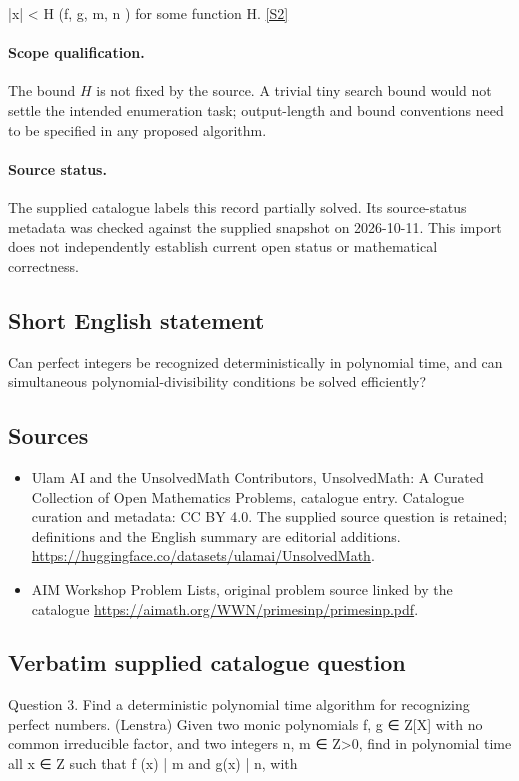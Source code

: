 \documentclass[11pt]{article}
\begin{document}
|x| < H (f, g, m, n ) for some function H. \href{https://aimath.org/WWN/primesinp/primesinp.pdf}{[S2]}
\paragraph{Scope qualification.}
The bound $H$ is not fixed by the source. A trivial tiny search bound would not settle the intended enumeration task; output-length and bound conventions need to be specified in any proposed algorithm.
\paragraph{Source status.}
The supplied catalogue labels this record partially solved. Its source-status metadata was checked against the supplied snapshot on 2026-10-11. This import does not independently establish current open status or mathematical correctness.
\subsection{Short English statement}
Can perfect integers be recognized deterministically in polynomial time, and can simultaneous polynomial-divisibility conditions be solved efficiently?
\subsection{Sources}
\begin{itemize}
\item[S1] Ulam AI and the UnsolvedMath Contributors, UnsolvedMath: A Curated Collection of Open Mathematics Problems, catalogue entry. Catalogue curation and metadata: CC BY 4.0. The supplied source question is retained; definitions and the English summary are editorial additions.
\url{https://huggingface.co/datasets/ulamai/UnsolvedMath}.
\item[S2] AIM Workshop Problem Lists, original problem source linked by the catalogue
\url{https://aimath.org/WWN/primesinp/primesinp.pdf}.
\end{itemize}
\subsection{Verbatim supplied catalogue question}
Question 3. Find a deterministic polynomial time algorithm for recognizing perfect numbers. (Lenstra) Given two monic polynomials f, g ∈ Z[X] with no common irreducible factor, and two integers n, m ∈ Z>0, find in polynomial time all x ∈ Z such that f (x) | m and g(x) | n, with
\end{document}
